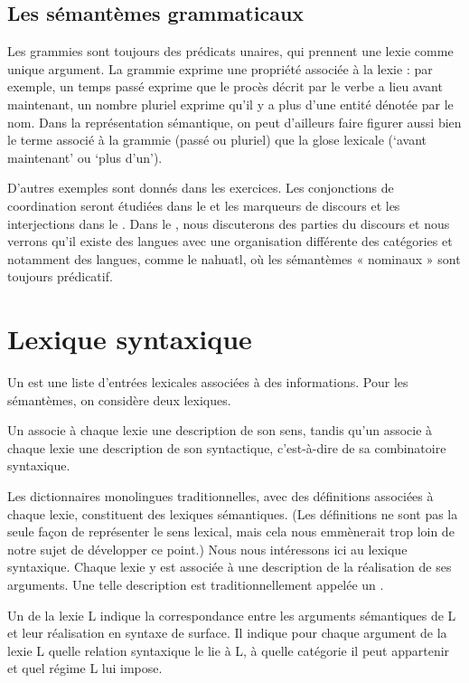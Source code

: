 \subsection{Les sémantèmes grammaticaux} 
Les grammies sont toujours des prédicats unaires, qui prennent une lexie comme unique argument. La grammie exprime une propriété associée à la lexie : par exemple, un temps passé exprime que le procès décrit par le verbe a lieu avant maintenant, un nombre pluriel exprime qu’il y a plus d’une entité dénotée par le nom. Dans la représentation sémantique, on peut d’ailleurs faire figurer aussi bien le terme associé à la grammie (passé ou pluriel) que la glose lexicale (‘avant maintenant’ ou ‘plus d’un’).

D’autres exemples sont donnés dans les exercices. Les conjonctions de coordination seront étudiées dans le  et les marqueurs de discours et les interjections dans le . Dans le , nous discuterons des parties du discours et nous verrons qu’il existe des langues avec une organisation différente des catégories et notamment des langues, comme le nahuatl, où les sémantèmes « nominaux » sont toujours prédicatif.

\section{Lexique syntaxique}
Un  est une liste d’entrées lexicales associées à des informations. Pour les sémantèmes, on considère deux lexiques.

{Un  associe à chaque lexie une description de son sens, tandis qu’un  associe à chaque lexie une description de son syntactique, c'est-à-dire de sa combinatoire syntaxique.}

Les dictionnaires monolingues traditionnelles, avec des définitions associées à chaque lexie, constituent des lexiques sémantiques. (Les définitions ne sont pas la seule façon de représenter le sens lexical, mais cela nous emmènerait trop loin de notre sujet de développer ce point.) Nous nous intéressons ici au lexique syntaxique. Chaque lexie y est associée à une description de la réalisation de ses arguments. Une telle description est traditionnellement appelée un . 

{Un  de la lexie L indique la correspondance entre les arguments sémantiques de L et leur réalisation en syntaxe de surface. Il indique pour chaque argument de la lexie L quelle relation syntaxique le lie à L, à quelle catégorie il peut appartenir et quel régime L lui impose.}

